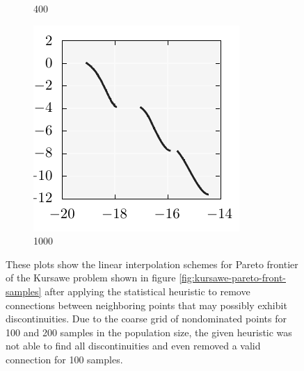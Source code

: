 \documentclass{stdlocal}
\begin{document}
\begin{figure}[t]
\begin{subfigure}[b]{0.24\textwidth}
        \caption{400}
      \end{subfigure}
      \begin{subfigure}[b]{0.24\textwidth}
        \center
        \includegraphics[width=\textwidth]{../../plots/kursawe_1000_tessellation.pdf}
        \caption{1000}
      \end{subfigure}
      \caption[]{%
        These plots show the linear interpolation schemes for Pareto frontier of the Kursawe problem shown in figure \ref{fig:kursawe-pareto-front-samples} after applying the statistical heuristic to remove connections between neighboring points that may possibly exhibit discontinuities.
        Due to the coarse grid of nondominated points for 100 and 200 samples in the population size, the given heuristic was not able to find all discontinuities and even removed a valid connection for 100 samples.
      }
      \label{fig:kursawe-pareto-front-tessellation}
    \end{figure}
\end{document}
